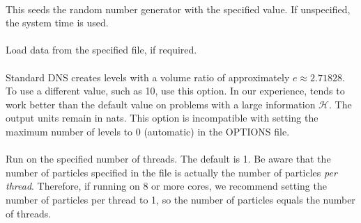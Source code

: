 \documentclass[article]{jss}
\begin{document}
\\
This seeds the random number generator with the specified value. If unspecified, the system time is used.\\

\\
Load data from the specified file, if required.\\

\\
Standard DNS creates levels with a volume ratio of approximately
$e\approx 2.71828$. To use a different value, such as 10, use this option.
In our experience,  tends to work better than the default
value on problems with a large information $\mathcal{H}$.
The output units remain in nats.
This option is incompatible with setting the maximum number of levels to 0
(automatic) in the OPTIONS file.
\\

\\
Run on the specified number of threads. The default is 1.
Be aware that the number of particles specified in the 
file is actually the number of particles {\em per thread}. Therefore,
if running on 8 or more cores, we recommend setting the number of particles
per thread to 1, so the number of particles equals the number of threads.





\end{document}
